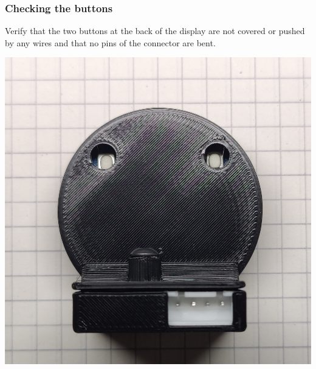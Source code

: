 \documentclass[]{article}
\begin{document}
\subsubsection{Checking the buttons}
\begin{minipage}[t]{0.5\linewidth}
	\vspace{0pt}
	Verify that the two buttons at the back of the display are not covered or pushed by any wires and that no pins of the connector are bent.
\end{minipage}
\hfill
\begin{minipage}[t]{0.4\linewidth}
	\vspace{0pt}
	\includegraphics[width=\linewidth]{images/01_displayunit/19_check_buttons_pins.jpg}
\end{minipage}
\end{document}
